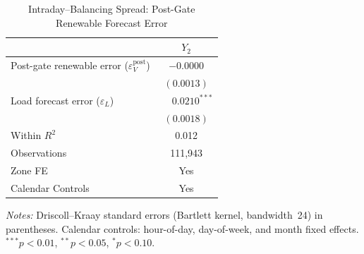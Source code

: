 \documentclass{article}
\begin{document}
\begin{table}[htbp]
\centering
\caption{Intraday--Balancing Spread: Post-Gate Renewable Forecast Error}
\label{tab:3}
\begin{threeparttable}
\begin{tabularx}{\linewidth}{>{\raggedright\arraybackslash}Xc}
\toprule
 & $Y_2$ \\
\midrule
Post-gate renewable error ($\varepsilon_V^{\mathrm{post}}$) & $-0.0000$ \\
 & $(0.0013)$ \\[0.4ex]
Load forecast error ($\varepsilon_L$) & $\phantom{-}0.0210^{***}$ \\
 & $(0.0018)$ \\
\midrule
Within $R^2$ & 0.012 \\
Observations & 111,943 \\
Zone FE & Yes \\
Calendar Controls & Yes \\
\bottomrule
\end{tabularx}
\begin{tablenotes}[flushleft]
\footnotesize
\item \textit{Notes:} Driscoll--Kraay standard errors (Bartlett kernel, bandwidth~24) in parentheses. Calendar controls: hour-of-day, day-of-week, and month fixed effects. $^{***}p<0.01$, $^{**}p<0.05$, $^{*}p<0.10$.
\end{tablenotes}
\end{threeparttable}
\end{table}
\end{document}
